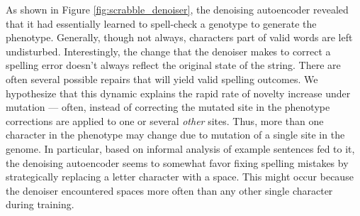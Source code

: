 As shown in Figure \ref{fig:scrabble_denoiser}, the denoising autoencoder revealed that it had essentially learned to spell-check a genotype to generate the phenotype.
Generally, though not always, characters part of valid words are left undisturbed.
Interestingly, the change that the denoiser makes to correct a spelling error doesn't always reflect the original state of the string.
There are often several possible repairs that will yield valid spelling outcomes.
We hypothesize that this dynamic explains the rapid rate of novelty increase under mutation --- often, instead of correcting the mutated site in the phenotype corrections are applied to one or several \textit{other} sites.
Thus, more than one character in the phenotype may change due to mutation of a single site in the genome.
In particular, based on informal analysis of example sentences fed to it, the denoising autoencoder seems to somewhat favor fixing spelling mistakes by strategically replacing a letter character with a space.
This might occur because the denoiser encountered spaces more often than any other single character during training.
